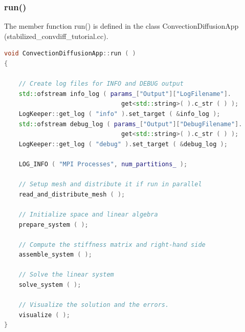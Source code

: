\documentclass[a4paper, 11pt, twoside]{article}
\begin{document}
\subsubsection{run()}
The member function run() is defined in the class ConvectionDiffusionApp (stabilized\_convdiff\_tutorial.cc).

\begin{lstlisting}[language=C++, basicstyle={\footnotesize, \ttfamily}, keywordstyle=\color{blue}, numbers=none, tabsize=4]
void ConvectionDiffusionApp::run ( )
{

    // Create log files for INFO and DEBUG output
    std::ofstream info_log ( params_["Output"]["LogFilename"].
    							get<std::string>( ).c_str ( ) );
    LogKeeper::get_log ( "info" ).set_target ( &info_log );
    std::ofstream debug_log ( params_["Output"]["DebugFilename"].
    							get<std::string>( ).c_str ( ) );
    LogKeeper::get_log ( "debug" ).set_target ( &debug_log );

    LOG_INFO ( "MPI Processes", num_partitions_ );

    // Setup mesh and distribute it if run in parallel
    read_and_distribute_mesh ( );

    // Initialize space and linear algebra
    prepare_system ( );

    // Compute the stiffness matrix and right-hand side
    assemble_system ( );

    // Solve the linear system
    solve_system ( );

    // Visualize the solution and the errors.
    visualize ( );
}
\end{lstlisting}
\end{document}
